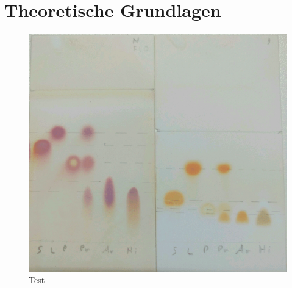\section{Theoretische Grundlagen}

  \begin{figure}[H]
    \includegraphics[scale=0.25, center]{images/test.png} 
    \caption[Quelle: Autor]{Test}
    \label{fig:Test}
  \end{figure}
      